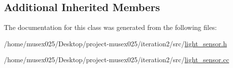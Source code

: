 \subsection*{Additional Inherited Members}


The documentation for this class was generated from the following files\+:\begin{DoxyCompactItemize}
\item 
/home/musex025/\+Desktop/project-\/musex025/iteration2/src/\hyperlink{light__sensor_8h}{light\+\_\+sensor.\+h}\item 
/home/musex025/\+Desktop/project-\/musex025/iteration2/src/\hyperlink{light__sensor_8cc}{light\+\_\+sensor.\+cc}\end{DoxyCompactItemize}
